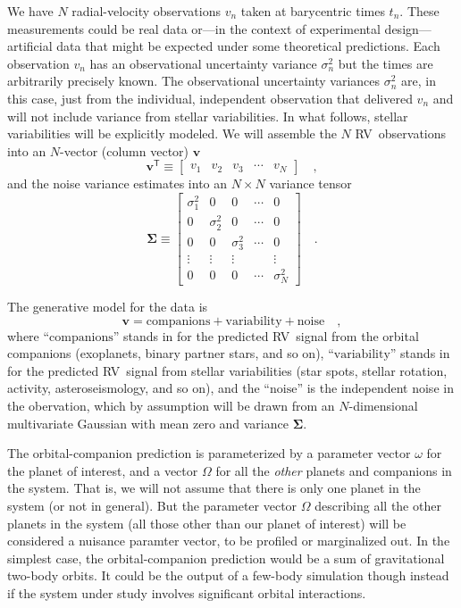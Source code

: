\documentclass[modern]{aastex63}
\newcommand{\acronym}[1]{{\small{#1}}}
\newcommand{\rv}{\acronym{RV}}
\newcommand{\T}{^{\!\mathsf{T}\!}}
\renewcommand{\vector}[1]{\boldsymbol{#1}}
\renewcommand{\tensor}[1]{\mathbf{#1}}
\newcommand{\vv}{\vector{v}}
\newcommand{\tSigma}{\tensor{\Sigma}}
\begin{document}
We have $N$ radial-velocity observations $v_n$ taken at barycentric times
$t_n$.
These measurements could be real data or---in the context of experimental
design---artificial data that might be expected under some theoretical
predictions.
Each observation $v_n$ has an observational uncertainty variance
$\sigma^2_n$ but the times are arbitrarily precisely known.
The observational uncertainty variances $\sigma^2_n$ are, in this case,
just from the individual, independent observation that delivered $v_n$
and will not include variance from stellar variabilities.
In what follows, stellar variabilities will be explicitly modeled.
We will assemble the $N$ \rv\ observations into an $N$-vector (column vector) $\vv$
\begin{equation}
  \vv\T \equiv \begin{bmatrix} v_1 & v_2 & v_3 & \cdots & v_N \end{bmatrix}
  \quad ,
\end{equation}
and the noise variance estimates into an $N\times N$ variance tensor
\begin{equation}
  \tSigma \equiv \begin{bmatrix} \sigma_1^2 & 0 & 0 & \cdots & 0 \\
                                 0 & \sigma_2^2 & 0 & \cdots & 0 \\
                                 0 & 0 & \sigma_3^2 & \cdots & 0 \\
                                 \vdots & \vdots & \vdots & & \vdots \\
                                 0 & 0 & 0 & \cdots & \sigma_N^2 \end{bmatrix}
  \quad .
\end{equation}

The generative model for the data is
\begin{equation}
  \vv = \mbox{companions} + \mbox{variability} + \mbox{noise}
  \quad ,
\end{equation}
where ``$\mbox{companions}$'' stands in for the predicted \rv\ signal
from the orbital companions (exoplanets, binary partner stars, and so
on),
``$\mbox{variability}$'' stands in for the predicted \rv\ signal from
stellar variabilities (star spots, stellar rotation, activity,
asteroseismology, and so on),
and
the ``$\mbox{noise}$'' is the independent noise in the obervation,
which by assumption will be drawn from an $N$-dimensional
multivariate Gaussian with mean zero and variance $\tSigma$.

The orbital-companion prediction is parameterized by a parameter
vector $\omega$ for the planet of interest, and a vector $\Omega$ for
all the \emph{other} planets and companions in the system.
That is, we will not assume that there is only one planet in the
system (or not in general).
But the parameter vector $\Omega$ describing all the other planets in
the system (all those other than our planet of interest) will be
considered a nuisance paramter vector, to be profiled or marginalized
out.
In the simplest case, the orbital-companion prediction would be a sum
of gravitational two-body orbits.
It could be the output of a few-body simulation though instead if the
system under study involves significant orbital interactions.
\end{document}
